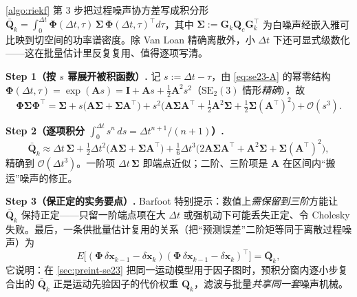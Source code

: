 \begin{derivation}
\label{deriv:Q-series}
\cref{algo:riekf} 第 3 步把过程噪声协方差写成积分形 $\bar{\mathbf{Q}}_k=\int_0^{\Delta t}\boldsymbol{\Phi}(\Delta t,\tau)\,\boldsymbol{\Sigma}\,\boldsymbol{\Phi}(\Delta t,\tau)^\top d\tau$，其中 $\boldsymbol{\Sigma}:=\mathbf{G}_k\mathbf{Q}_c\mathbf{G}_k^\top$ 为白噪声经嵌入雅可比映到切空间的功率谱密度。除 Van Loan 精确离散外，小 $\Delta t$ 下还可显式级数化——这在批量估计里反复复用、值得逐项写清\cite{barfoot2024state}。

\textbf{Step 1（按 $s$ 幂展开被积函数）.}\; 记 $s:=\Delta t-\tau$，由 \cref{eq:se23-A} 的幂零结构 $\boldsymbol{\Phi}(\Delta t,\tau)=\exp(\mathbf{A}s)=\mathbf{I}+\mathbf{A}s+\tfrac12\mathbf{A}^2s^2$（$\mathrm{SE}_2(3)$ 情形\emph{精确}），故
\[
  \boldsymbol{\Phi}\boldsymbol{\Sigma}\boldsymbol{\Phi}^\top
  =\boldsymbol{\Sigma}+s\big(\mathbf{A}\boldsymbol{\Sigma}+\boldsymbol{\Sigma}\mathbf{A}^\top\big)
  +s^2\big(\mathbf{A}\boldsymbol{\Sigma}\mathbf{A}^\top+\tfrac12\mathbf{A}^2\boldsymbol{\Sigma}+\tfrac12\boldsymbol{\Sigma}(\mathbf{A}^\top)^2\big)+\mathcal{O}(s^3).
\]

\textbf{Step 2（逐项积分 $\int_0^{\Delta t}s^n\,ds=\Delta t^{n+1}/(n+1)$）.}\;
\begin{equation}
  \bar{\mathbf{Q}}_k\approx\Delta t\,\boldsymbol{\Sigma}
  +\tfrac12\Delta t^2\big(\mathbf{A}\boldsymbol{\Sigma}+\boldsymbol{\Sigma}\mathbf{A}^\top\big)
  +\tfrac16\Delta t^3\big(2\mathbf{A}\boldsymbol{\Sigma}\mathbf{A}^\top+\mathbf{A}^2\boldsymbol{\Sigma}+\boldsymbol{\Sigma}(\mathbf{A}^\top)^2\big),
  \label{eq:Q-series}
\end{equation}
精确到 $\mathcal{O}(\Delta t^3)$。一阶项 $\Delta t\,\boldsymbol{\Sigma}$ 即端点近似；二阶、三阶项是 $\mathbf{A}$ 在区间内“搬运”噪声的修正。

\textbf{Step 3（保正定的实务要点）.}\; Barfoot 特别提示：数值上\emph{需保留到三阶}方能让 $\bar{\mathbf{Q}}_k$ 保持正定\cite{barfoot2024state}——只留一阶端点项在大 $\Delta t$ 或强机动下可能丢失正定、令 Cholesky 失败。最后，一条供批量估计复用的关系（把“预测误差”二阶矩等同于离散过程噪声）为
\begin{equation}
  E\big[(\boldsymbol{\Phi}\,\delta\mathbf{x}_{k-1}-\delta\mathbf{x}_k)(\boldsymbol{\Phi}\,\delta\mathbf{x}_{k-1}-\delta\mathbf{x}_k)^\top\big]=\bar{\mathbf{Q}}_k,
  \label{eq:Q-batch}
\end{equation}
它说明：在 \cref{sec:preint-se23} 把同一运动模型用于因子图时，预积分窗内逐小步复合出的 $\bar{\mathbf{Q}}_k$ 正是运动先验因子的代价权重 $\mathbf{Q}_k$，滤波与批量\emph{共享同一套}噪声机械。
\end{derivation}

